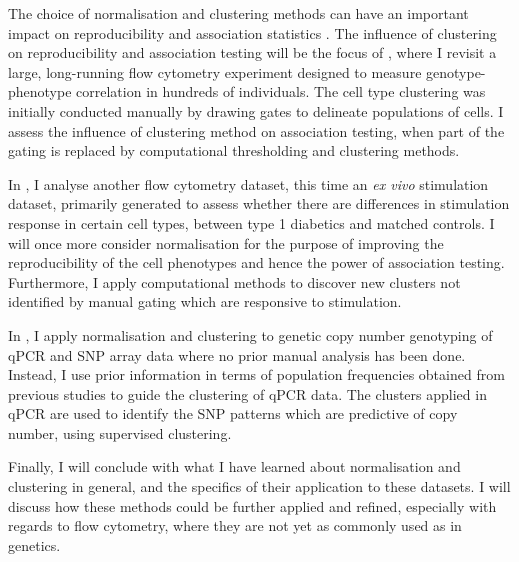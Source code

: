 The choice of normalisation and clustering methods can have an important impact on reproducibility and association statistics \citep{Plagnol:2007dw}.
The influence of clustering on reproducibility and association testing will be the focus of , where I revisit a large,
long-running flow cytometry experiment designed to measure genotype-phenotype correlation in hundreds of individuals.
The cell type clustering was initially conducted manually by drawing gates to delineate populations of cells.
I assess the influence of clustering method on association testing,
when part of the gating is replaced by computational thresholding and clustering methods.

In , I analyse another flow cytometry dataset, this time an \emph{ex vivo} stimulation dataset,
primarily generated to assess whether there are differences in stimulation response in certain cell types, between type 1 diabetics and matched controls.
I will once more consider normalisation for the purpose of improving the reproducibility of the cell phenotypes and hence the power of association testing.
Furthermore, I apply computational methods to discover new clusters not identified by manual gating which are responsive to stimulation.

In , I apply normalisation and clustering to genetic copy number genotyping of \gls{qPCR} and \gls{SNP} array data
where no prior manual analysis has been done.
Instead, I use prior information in terms of population frequencies obtained from previous studies to guide the clustering of qPCR data.
The clusters applied in qPCR are used to identify the SNP patterns which are predictive of copy number, using supervised clustering.

Finally, I will conclude with what I have learned about normalisation and clustering in general, and the specifics of their application to these datasets.
I will discuss how these methods could be further applied and refined, especially with regards to flow cytometry,
where they are not yet as commonly used as in genetics.  

